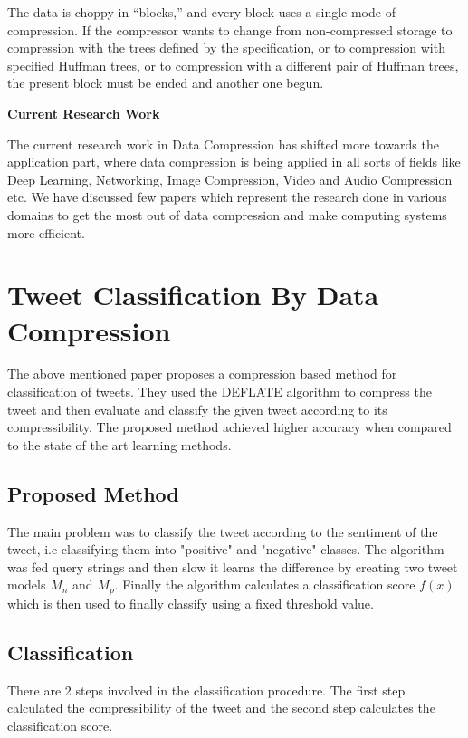 \documentclass{article}
\begin{document}
The data is choppy in ``blocks,'' and every block uses a single mode of compression. If the compressor wants to change  from non-compressed storage to compression with the trees defined by the specification, or to compression with specified Huffman trees, or to compression with a different pair of Huffman trees, the present block must be ended and another one begun.


\vspace{0.6in}

\textbf{\Large{Current Research Work}}


The current research work in Data Compression has shifted more towards the application part, where data compression is being applied in all sorts of fields like Deep Learning, Networking, Image Compression, Video and Audio Compression etc. We have discussed few papers which represent the research done in various domains to get the most out of data compression and make computing systems more efficient.

\section{Tweet Classification By Data Compression \cite{10.1145/2064448.2064473}}

The above mentioned paper proposes a compression based method for classification of tweets. They used the DEFLATE algorithm to compress the tweet and then evaluate and classify the given tweet according to its compressibility. The proposed method achieved higher accuracy when compared to the state of the art learning methods. 

\subsection{Proposed Method}

The main problem was to classify the tweet according to the sentiment of the tweet, i.e classifying them into "positive" and "negative" classes. The algorithm was fed query strings and then slow it learns the difference by creating two tweet models $M_n$ and $M_p$. Finally the algorithm calculates a classification score $f(x)$ which is then used to finally classify using a fixed threshold value.

\subsection{Classification}

There are 2 steps involved in the classification procedure. The first step calculated the compressibility of the tweet and the second step calculates the classification score. \\ 
\end{document}
